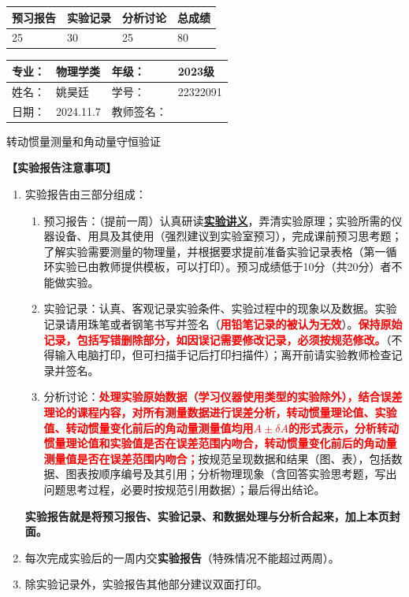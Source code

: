 \documentclass[dvipsnames, svgnames,a4paper,11pt]{article}
\begin{document}
\begin{table}
	\renewcommand\arraystretch{1.7}
	\begin{tabularx}{\textwidth}{
		|X|X|X|X
		|X|X|X|X|}
	\hline
	\multicolumn{2}{|c|}{预习报告}&\multicolumn{2}{|c|}{实验记录}&\multicolumn{2}{|c|}{分析讨论}&\multicolumn{2}{|c|}{总成绩}\\
	\hline
	 25& &30  & &25  & &80& \\
	\hline
	\end{tabularx}
\end{table}


\begin{table}
	\renewcommand\arraystretch{1.7}
	\begin{tabularx}{\textwidth}{|X|X|X|X|}
	\hline
	专业：& 物理学类 &年级：& 2023级\\
	\hline
	姓名：& 姚昊廷  & 学号：&22322091\\
	\hline
	日期：& 2024.11.7& 教师签名：& \\
	\hline
	\end{tabularx}
\end{table}

\begin{center}
	\LARGE 转动惯量测量和角动量守恒验证
\end{center}

\textbf{【实验报告注意事项】}
\begin{enumerate}
	\item 实验报告由三部分组成：
	\begin{enumerate}
		\item 预习报告：（提前一周）认真研读\underline{\textbf{实验讲义}}，弄清实验原理；实验所需的仪器设备、用具及其使用（强烈建议到实验室预习），完成课前预习思考题；了解实验需要测量的物理量，并根据要求提前准备实验记录表格（第一循环实验已由教师提供模板，可以打印）。预习成绩低于10分（共20分）者不能做实验。
	    \item 实验记录：认真、客观记录实验条件、实验过程中的现象以及数据。实验记录请用珠笔或者钢笔书写并签名（\textcolor{red}{\textbf{用铅笔记录的被认为无效}}）。\textcolor{red}{\textbf{保持原始记录，包括写错删除部分，如因误记需要修改记录，必须按规范修改。}}（不得输入电脑打印，但可扫描手记后打印扫描件）；离开前请实验教师检查记录并签名。
	    \item 分析讨论：\textcolor{red}{\textbf{处理实验原始数据（学习仪器使用类型的实验除外），结合误差理论的课程内容，对所有测量数据进行误差分析，转动惯量理论值、实验值、转动惯量变化前后的角动量测量值均用$A\pm \delta A$的形式表示，分析转动惯量理论值和实验值是否在误差范围内吻合，转动惯量变化前后的角动量测量值是否在误差范围内吻合；}}按规范呈现数据和结果（图、表），包括数据、图表按顺序编号及其引用；分析物理现象（含回答实验思考题，写出问题思考过程，必要时按规范引用数据）；最后得出结论。
	\end{enumerate}
	\textbf{实验报告就是将预习报告、实验记录、和数据处理与分析合起来，加上本页封面。}
	\item 每次完成实验后的一周内交\textbf{实验报告}（特殊情况不能超过两周）。
	\item 除实验记录外，实验报告其他部分建议双面打印。
\end{enumerate}
\end{document}
